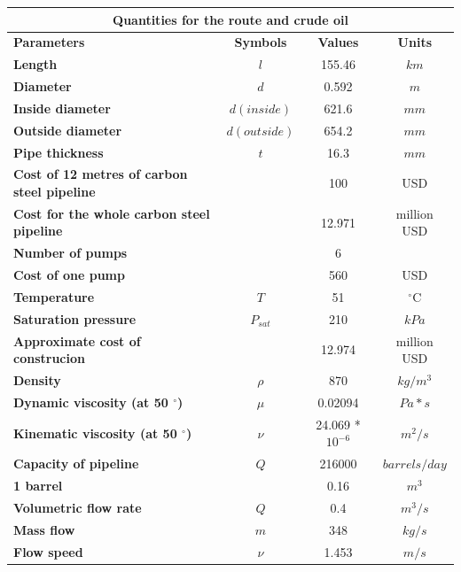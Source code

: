 \documentclass[12pt]{article}
\begin{document}
      
\begin{table}[H]
  \centering
  \begin{tabular}{|l|c|c|c|}
    \hline
    \multicolumn{4}{|c|}{Quantities for the route and crude oil} \\
    \hline
    \textbf{Parameters} & \textbf{Symbols} & \textbf{Values} & \textbf{Units} \\
    \hline
    \textbf{Length} & $l$ & 155.46 & $km$ \\
    \hline
    \textbf{Diameter} & $d$ & 0.592 & $m$ \\
    \hline
    \textbf{Inside diameter} & $d(inside)$ & 621.6 & $mm$ \\
    \hline
    \textbf{Outside diameter} & $d(outside)$ & 654.2 & $mm$ \\
    \hline
    \textbf{Pipe thickness} & $t$ & 16.3 & $mm$ \\
    \hline
    \textbf{Cost of 12 metres of carbon steel pipeline} & & 100 & USD \\
    \hline 
    \textbf{Cost for the whole carbon steel pipeline} & & 12.971 & million USD \\
    \hline
    \textbf{Number of pumps} & & 6 & \\
    \hline
    \textbf{Cost of one pump} & & 560 & USD \\
    \hline
    \textbf{Temperature} & $T$ & 51 & $^\circ$C \\
    \hline
    \textbf{Saturation pressure} & $P_{sat}$ & 210 & $kPa$ \\
    \hline
    \textbf{Approximate cost of construcion} & & 12.974 & million USD \\
    \hline
    \textbf{Density} & ${\rho}$ & 870 & $kg/m^3$ \\
    \hline
    \textbf{Dynamic viscosity (at 50 $^\circ$)} & $\mu$  & 0.02094 & $Pa*s$ \\
    \hline
    \textbf{Kinematic viscosity (at 50 $^\circ$)} & $\nu$ & 24.069 * $10^{-6}$   & $m^2/s$ \\
    \hline
    \textbf{Capacity of pipeline} & $Q$ & 216000 & $barrels/day$ \\
    \hline
    \textbf{1 barrel} & & 0.16 & $m^3$ \\
    \hline
    \textbf{Volumetric flow rate} & $Q$ & 0.4 & $m^3/s$ \\
    \hline
    \textbf{Mass flow}  & $m$ & 348 & $kg/s$ \\
    \hline
    \textbf{Flow speed} & $\nu$ & 1.453 & $m/s$ \\

\end{tabular}
\end{table}
\end{document}
